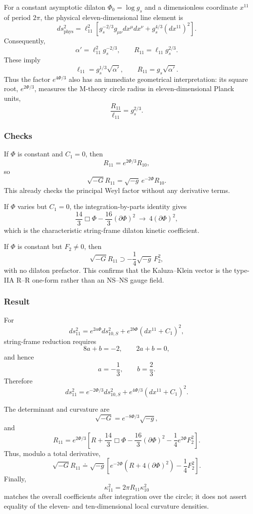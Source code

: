 \documentclass[
  10pt,
  a4paper,
  openany]{book}
\begin{document}
For a constant asymptotic dilaton \(\Phi_0=\log g_s\) and a
dimensionless coordinate \(x^{11}\) of period \(2\pi\), the physical
eleven-dimensional line element is \[
ds_{\mathrm{phys}}^2
=\ell_{11}^2
\left[
g_s^{-2/3}g_{\mu\nu}dx^\mu dx^\nu
+g_s^{4/3}(dx^{11})^2
\right].
\] Consequently, \[
\alpha'
=\ell_{11}^2g_s^{-2/3},
\qquad
R_{11}
=\ell_{11}g_s^{2/3}.
\] These imply \[
\boxed{
\ell_{11}
=g_s^{1/3}\sqrt{\alpha'},
\qquad
R_{11}
=g_s\sqrt{\alpha'}
}.
\] Thus the factor \(e^{4\Phi/3}\) also has an immediate geometrical
interpretation: its square root, \(e^{2\Phi/3}\), measures the M-theory
circle radius in eleven-dimensional Planck units, \[
\boxed{
\frac{R_{11}}{\ell_{11}}
=g_s^{2/3}
}.
\]

\subsubsection{Checks}\label{checks-34}

If \(\Phi\) is constant and \(C_1=0\), then \[
R_{11}
=e^{2\Phi/3}R_{10},
\] so \[
\sqrt{-G}R_{11}
=\sqrt{-g}\,e^{-2\Phi}R_{10}.
\] This already checks the principal Weyl factor without any derivative
terms.

If \(\Phi\) varies but \(C_1=0\), the integration-by-parts identity
gives \[
\frac{14}{3}\Box\Phi-\frac{16}{3}(\partial\Phi)^2
\ \longrightarrow\
4(\partial\Phi)^2,
\] which is the characteristic string-frame dilaton kinetic coefficient.

If \(\Phi\) is constant but \(F_2\neq0\), then \[
\sqrt{-G}R_{11}
\supset
-\frac14\sqrt{-g}\,F_2^2,
\] with no dilaton prefactor. This confirms that the Kaluza--Klein
vector is the type-IIA R--R one-form rather than an NS--NS gauge field.

\subsubsection{Result}\label{result-40}

For \[
ds_{11}^2
=e^{2a\Phi}ds_{10,S}^2
+e^{2b\Phi}(dx^{11}+C_1)^2,
\] string-frame reduction requires \[
\boxed{
8a+b=-2,
\qquad
2a+b=0
},
\] and hence \[
\boxed{
a=-\frac13,
\qquad
b=\frac23
}.
\] Therefore \[
\boxed{
ds_{11}^2
=e^{-2\Phi/3}ds_{10,S}^2
+e^{4\Phi/3}(dx^{11}+C_1)^2
}.
\]

The determinant and curvature are \[
\boxed{
\sqrt{-G}
=e^{-8\Phi/3}\sqrt{-g}
},
\] and \[
\boxed{
R_{11}
=e^{2\Phi/3}
\left[
R
+\frac{14}{3}\Box\Phi
-\frac{16}{3}(\partial\Phi)^2
-\frac14e^{2\Phi}F_2^2
\right]
}.
\] Thus, modulo a total derivative, \[
\boxed{
\sqrt{-G}R_{11}
\doteq
\sqrt{-g}
\left[
e^{-2\Phi}
\left(R+4(\partial\Phi)^2\right)
-\frac14F_2^2
\right]
}.
\] Finally, \[
\boxed{
\kappa_{11}^2
=2\pi R_{11}\kappa_{10}^2
}
\] matches the overall coefficients after integration over the circle;
it does not assert equality of the eleven- and ten-dimensional local
curvature densities.
\end{document}
